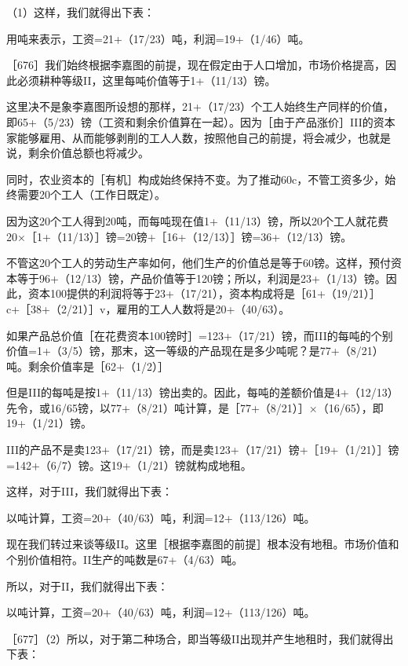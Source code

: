 （1）这样，我们就得出下表：

\todo{}

用吨来表示，工资=21+（17/23）吨，利润=19+（1/46）吨。

［676］我们始终根据李嘉图的前提，现在假定由于人口增加，市场价格提高，因此必须耕种等级II，这里每吨价值等于1+（11/13）镑。

这里决不是象李嘉图所设想的那样，21+（17/23）个工人始终生产同样的价值，即65+（5/23）镑（工资和剩余价值算在一起）。因为［由于产品涨价］III的资本家能够雇用、从而能够剥削的工人人数，按照他自己的前提，将会减少，也就是说，剩余价值总额也将减少。

同时，农业资本的［有机］构成始终保持不变。为了推动60c，不管工资多少，始终需要20个工人（工作日既定）。

因为这20个工人得到20吨，而每吨现在值1+（11/13）镑，所以20个工人就花费20×［1+（11/13）］镑=20镑+［16+（12/13）］镑=36+（12/13）镑。

不管这20个工人的劳动生产率如何，他们生产的价值总是等于60镑。这样，预付资本等于96+（12/13）镑，产品价值等于120镑；所以，利润是23+（1/13）镑。因此，资本100提供的利润将等于23+（17/21），资本构成将是［61+（19/21）］c+［38+（2/21）］v，雇用的工人人数将是20+（40/63）。

如果产品总价值［在花费资本100镑时］=123+（17/21）镑，而III的每吨的个别价值=1+（3/5）镑，那末，这一等级的产品现在是多少吨呢？是77+（8/21）吨。剩余价值率是［62+（1/2）］%

但是III的每吨是按1+（11/13）镑出卖的。因此，每吨的差额价值是4+（12/13）先令，或16/65镑，以77+（8/21）吨计算，是［77+（8/21）］×（16/65），即19+（1/21）镑。

III的产品不是卖123+（17/21）镑，而是卖123+（17/21）镑+［19+（1/21）］镑=142+（6/7）镑。这19+（1/21）镑就构成地租。

这样，对于III，我们就得出下表：

\todo{}

以吨计算，工资=20+（40/63）吨，利润=12+（113/126）吨。

现在我们转过来谈等级II。这里［根据李嘉图的前提］根本没有地租。市场价值和个别价值相符。II生产的吨数是67+（4/63）吨。

所以，对于II，我们就得出下表：

\todo{}

以吨计算，工资=20+（40/63）吨，利润=12+（113/126）吨。

［677］（2）所以，对于第二种场合，即当等级II出现并产生地租时，我们就得出下表：

\todo{}

